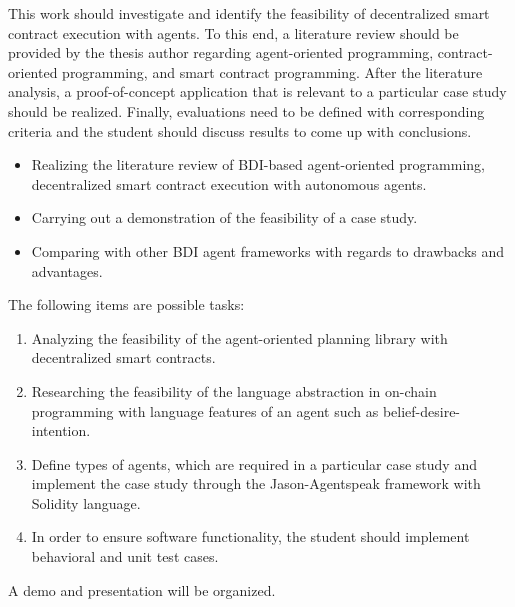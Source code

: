 \begin{task}[]
    \vspace{.5cm}
    
    This work should investigate and identify the feasibility of decentralized smart contract execution with agents. To this end, a literature review should be provided by the thesis author regarding agent-oriented programming, contract-oriented programming, and smart contract programming. After the literature analysis, a proof-of-concept application that is relevant to a particular case study should be realized. Finally, evaluations need to be defined with corresponding criteria and the student should discuss results to come up with conclusions.
	
	\minisec{\focusname}\smallskip
	\begin{itemize}
		\item Realizing the literature review of BDI-based agent-oriented programming, decentralized smart contract execution with autonomous agents.
        
		\item Carrying out a demonstration of the feasibility of a case study.
        
		\item Comparing with other BDI agent frameworks with regards to drawbacks and advantages.
	\end{itemize}

        \smallskip
        The following items are possible tasks:
        \begin{enumerate}
		\item Analyzing the feasibility of the agent-oriented planning library with decentralized smart contracts.
       
		\item Researching the feasibility of the language abstraction in on-chain programming with language features of an agent such as belief-desire-intention.
        
		\item Define types of agents, which are required in a particular case study and implement the case study through the Jason-Agentspeak framework with Solidity language. 
        
        \item  In order to ensure software functionality, the student should implement behavioral and unit test cases.
	\end{enumerate}
    A demo and presentation will be organized.
\end{task}

